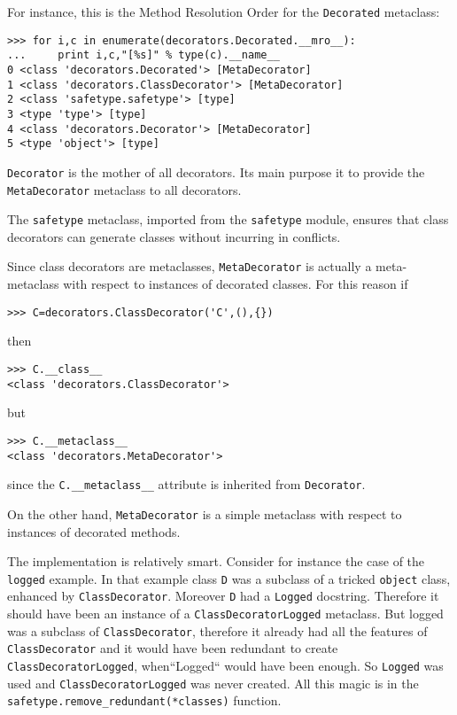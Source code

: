 \documentclass[11pt,english]{article}
\begin{document}
For instance, this is the Method Resolution Order for the \texttt{Decorated}
metaclass:
\begin{verbatim}>>> for i,c in enumerate(decorators.Decorated.__mro__): 
...     print i,c,"[%s]" % type(c).__name__
0 <class 'decorators.Decorated'> [MetaDecorator]
1 <class 'decorators.ClassDecorator'> [MetaDecorator]
2 <class 'safetype.safetype'> [type]
3 <type 'type'> [type]
4 <class 'decorators.Decorator'> [MetaDecorator]
5 <type 'object'> [type]\end{verbatim}

\texttt{Decorator} is the mother of all decorators. Its main purpose it to
provide the \texttt{MetaDecorator}
metaclass to all decorators.

The \texttt{safetype} metaclass, imported from the \texttt{safetype} module,
ensures that class decorators can generate classes without incurring 
in conflicts.

Since class decorators are metaclasses,
\texttt{MetaDecorator} is actually a meta-metaclass with respect to
instances of decorated classes. For this reason if
\begin{verbatim}>>> C=decorators.ClassDecorator('C',(),{})\end{verbatim}

then
\begin{verbatim}>>> C.__class__
<class 'decorators.ClassDecorator'>\end{verbatim}

but
\begin{verbatim}>>> C.__metaclass__ 
<class 'decorators.MetaDecorator'>\end{verbatim}

since the \texttt{C.{\_}{\_}metaclass{\_}{\_}} attribute is inherited from \texttt{Decorator}.

On the other hand, \texttt{MetaDecorator} is a simple metaclass with
respect to instances of decorated methods.

The implementation is relatively smart. Consider for instance the case of
the \texttt{logged} example. In that example class \texttt{D} was a subclass 
of a tricked \texttt{object} class, enhanced by \texttt{ClassDecorator}. Moreover \texttt{D} 
had a \texttt{Logged} docstring. Therefore it should have been an instance of a 
\texttt{ClassDecoratorLogged} metaclass. But logged was
a subclass of \texttt{ClassDecorator}, therefore it already had all the features
of \texttt{ClassDecorator} and it would have been redundant to create 
\texttt{ClassDecoratorLogged}, when``Logged`` would have been enough. 
So \texttt{Logged} was used and \texttt{ClassDecoratorLogged} was never created. 
All this magic is in the \texttt{safetype.remove{\_}redundant(*classes)} function.
\end{document}

